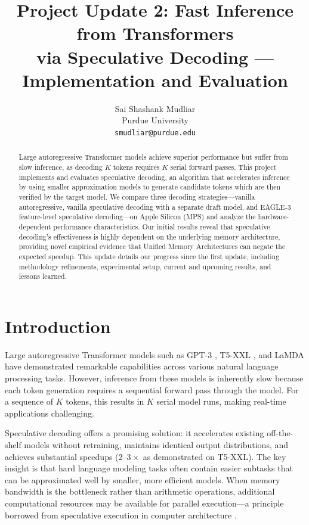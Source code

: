 \documentclass[11pt]{article}
\title{Project Update 2: Fast Inference from Transformers \\ via Speculative Decoding --- Implementation and Evaluation}
\author{Sai Shashank Mudliar \\
  Purdue University \\
  \texttt{smudliar@purdue.edu}
}
\begin{document}
\maketitle

\begin{abstract}
Large autoregressive Transformer models achieve superior performance but suffer from slow inference, as decoding $K$ tokens requires $K$ serial forward passes. This project implements and evaluates speculative decoding, an algorithm that accelerates inference by using smaller approximation models to generate candidate tokens which are then verified by the target model. We compare three decoding strategies---vanilla autoregressive, vanilla speculative decoding with a separate draft model, and EAGLE-3 feature-level speculative decoding---on Apple Silicon (MPS) and analyze the hardware-dependent performance characteristics. Our initial results reveal that speculative decoding's effectiveness is highly dependent on the underlying memory architecture, providing novel empirical evidence that Unified Memory Architectures can negate the expected speedup. This update details our progress since the first update, including methodology refinements, experimental setup, current and upcoming results, and lessons learned.
\end{abstract}

\section{Introduction}

Large autoregressive Transformer models such as GPT-3 \citep{brown2020language}, T5-XXL \citep{raffel2020exploring}, and LaMDA \citep{thoppilan2022lamda} have demonstrated remarkable capabilities across various natural language processing tasks. However, inference from these models is inherently slow because each token generation requires a sequential forward pass through the model. For a sequence of $K$ tokens, this results in $K$ serial model runs, making real-time applications challenging.

Speculative decoding \citep{leviathan2023fast} offers a promising solution: it accelerates existing off-the-shelf models without retraining, maintains identical output distributions, and achieves substantial speedups ($2$--$3\times$ as demonstrated on T5-XXL). The key insight is that hard language modeling tasks often contain easier subtasks that can be approximated well by smaller, more efficient models. When memory bandwidth is the bottleneck rather than arithmetic operations, additional computational resources may be available for parallel execution---a principle borrowed from speculative execution in computer architecture \citep{hennessy2011computer}.
\end{document}
